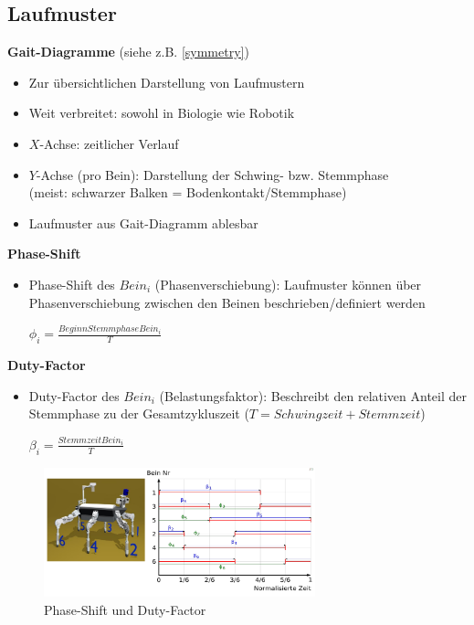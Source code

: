 \subsection{Laufmuster}
\textbf{Gait-Diagramme} (siehe z.B. \autoref{symmetry})
\begin{itemize}
\item Zur übersichtlichen Darstellung von Laufmustern
\item Weit verbreitet: sowohl in Biologie wie Robotik
\item $X$-Achse: zeitlicher Verlauf
\item $Y$-Achse (pro Bein): Darstellung der Schwing- bzw. Stemmphase\\
(meist: schwarzer Balken = Bodenkontakt/Stemmphase)
\item Laufmuster aus Gait-Diagramm \glqq ablesbar\grqq
\end{itemize}
\textbf{Phase-Shift}
\begin{itemize}
\item Phase-Shift des $Bein_i$ (Phasenverschiebung):
Laufmuster können über Phasenverschiebung zwischen den Beinen beschrieben/definiert werden\\
\begin{center}
$\phi_i = \frac{Beginn Stemmphase Bein_i}{T}$
\end{center}
\end{itemize}
\textbf{Duty-Factor}
\begin{itemize}
\item Duty-Factor des $Bein_i$ (Belastungsfaktor):
Beschreibt den relativen Anteil der Stemmphase zu der Gesamtzykluszeit ($T = Schwingzeit + Stemmzeit$)\\
\begin{center}
$\beta_i = \frac{Stemmzeit Bein_i}{T}$
\end{center}
\end{itemize}
\begin{figure}[h!]
	\centering
	\includegraphics[width=0.7\textwidth]{figures/ch06_PS_DF.png}
	\caption{Phase-Shift und Duty-Factor}
	\label{PS_DF}
\end{figure}
